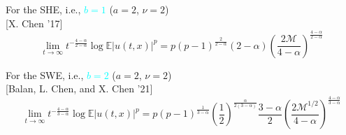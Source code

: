 \documentclass{beamer}%
\numberwithin{equation}{section}
\newcommand{\R}{\mathbb{R}}
\newcommand{\mySeparateLine}{
	\begin{center}
		\makebox[\linewidth]{\rule{0.6\paperwidth}{0.4pt}}
\end{center}}
\begin{document}
	\begin{frame}[c]%
		\begin{center}
			For the SHE, i.e., \textcolor{cyan}{$b=1$} ($a=2$, $\nu=2$)\\
			{\small [X. Chen '17]}
			\[
			\lim_{t\to \infty}t^{-\frac{4-\alpha}{2-\alpha}}\log \mathbb{E}|u(t,x)|^p =p(p-1)^{\frac{2}{2-\alpha}} (2-\alpha)\left(\frac{2\mathcal{M}}{4-\alpha}\right)^{\frac{4-\alpha}{2-\alpha}}
			\]
		\end{center}
		\vfill
		
		\mySeparateLine
		\only<2>{
			\begin{center}
				\textcolor{red}{$b\in (0,2)$ and $a \in (0,2]$ ??}
			\end{center} \vspace{-1.5em}}
		\mySeparateLine
		\vfill
		
		\begin{center}
			For the SWE, i.e., \textcolor{cyan}{$b=2$} ($a=2$, $\nu=2$)\\
			{\small [Balan, L. Chen, and X. Chen '21]}
			\[
			\lim_{t \to \infty} t^{-\frac{4-\alpha}{3-\alpha}} \log \mathbb{E}|u(t,x)|^p =p(p-1)^{\frac{1}{3-\alpha}} \left(\frac{1}{2}\right)^{\frac{\alpha}{2(3-\alpha)}} \frac{3- \alpha}{2} \left( \frac{2 \mathcal{M}^{1/2}}{4-\alpha} \right)^{\frac{4-\alpha}{3-\alpha}}
			\]
		\end{center}
		
	\end{frame}%
	
\end{document}
